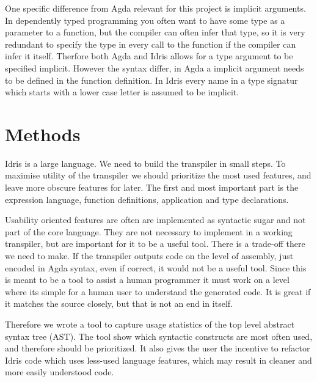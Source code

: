 \documentclass[parskip=half]{scrartcl}
\begin{document}
One specific difference from Agda relevant for this project is implicit
arguments. In dependently typed programming you often want to have some type as
a parameter to a function, but the compiler can often infer that type, so it is
very redundant to specify the type in every call to the function if the
compiler can infer it itself. Therfore both Agda and Idris allows for a type
argument to be specified implicit. However the syntax differ, in Agda
a implicit argument needs to be defined in the function definition. In Idris
every name in a type signatur which starts with a lower case letter is assumed
to be implicit.



\section{Methods}
Idris is a large language. We need to build the transpiler in small steps. To
maximise utility of the transpiler we should prioritize the most used features,
and leave more obscure features for later.
The first and most important part is
the expression language, function definitions, application and type
declarations.

Usability oriented features are often are implemented as syntactic sugar and
not part of the core language. They are not necessary to implement in a working
transpiler, but are important for it to be a useful tool. There is a trade-off
there we need to make. If the transpiler outputs code on the level of
assembly, just encoded in Agda syntax, even if correct, it would not be a useful
tool.
Since this is meant to be a tool to assist a human programmer it must
work on a level where its simple for a human user to understand the generated
code. It is great if it matches the source closely, but that is not an end in
itself.



Therefore we wrote a tool to capture usage statistics of the top level abstract
syntax tree (AST). The tool show which syntactic constructs are most often
used, and therefore should be prioritized. It also gives the user the
incentive to refactor Idris code which uses less-used language features,
which may result in cleaner and more easily understood code.
\end{document}
